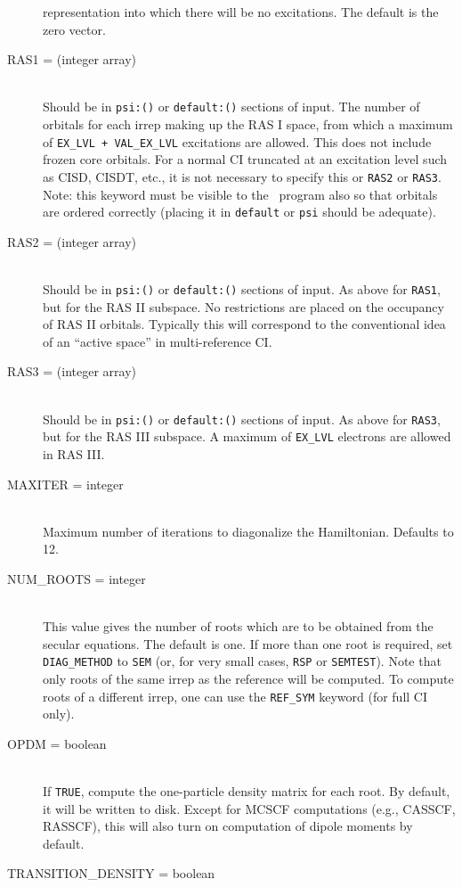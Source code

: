 \begin{description}
representation into which there will be no excitations.
The default is the zero vector.
\item[RAS1 = (integer array)]\mbox{}\\
Should be in {\tt psi:()} or {\tt default:()} sections of input.
The number of orbitals for each irrep making up the RAS I space,
from which a maximum of {\tt EX\_LVL + VAL\_EX\_LVL} excitations
are allowed.
This does not include frozen core orbitals.  For a normal
CI truncated at an excitation level such as CISD, CISDT, etc., it is
not necessary to specify this or {\tt RAS2} or {\tt RAS3}.
Note: this keyword must be visible to the \PSItransqt\ program
also so that orbitals are ordered correctly (placing it in 
{\tt default} or {\tt psi} should be adequate).
\item[RAS2 = (integer array)]\mbox{}\\
Should be in {\tt psi:()} or {\tt default:()} sections of input.
As above for {\tt RAS1}, but for the RAS II subspace.  
No restrictions are placed on the occupancy of RAS II orbitals.
Typically this will correspond to the conventional idea of
an ``active space'' in multi-reference CI.
\item[RAS3 = (integer array)]\mbox{}\\
Should be in {\tt psi:()} or {\tt default:()} sections of input.
As above for {\tt RAS3}, but for the RAS III subspace.
A maximum of {\tt EX\_LVL} electrons are allowed in RAS III.
\item[MAXITER = integer]\mbox{}\\
Maximum number of iterations to diagonalize the Hamiltonian.
Defaults to 12.
\item[NUM\_ROOTS = integer]\mbox{}\\
This value gives the number of roots which are to be obtained from
the secular equations.  The default is one.  If more than one root
is required, set {\tt DIAG\_METHOD} to {\tt SEM} (or, for very small cases,
{\tt RSP} or {\tt SEMTEST}).  Note that only roots of the same
irrep as the reference will be computed.  To compute roots of a different
irrep, one can use the {\tt REF\_SYM} keyword (for full CI only).
\item[OPDM = boolean]\mbox{}\\
If {\tt TRUE}, compute the one-particle density matrix for each root.  
By default, it will be written to disk.  Except for 
MCSCF computations (e.g., CASSCF, RASSCF), this will also turn on computation
of dipole moments by default.
\item[TRANSITION\_DENSITY = boolean]\mbox{}\\

\end{description}
